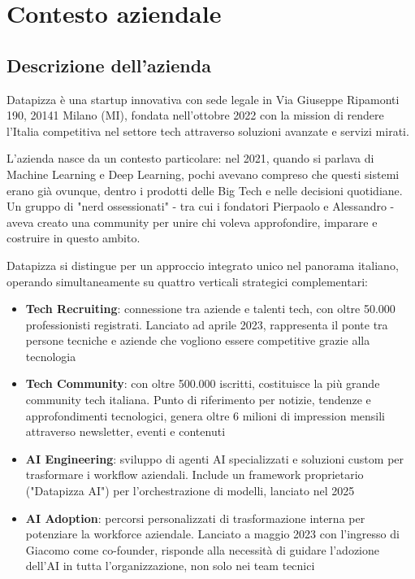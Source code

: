 \chapter{Contesto aziendale}

\section{Descrizione dell'azienda}
Datapizza è una startup innovativa con sede legale in Via Giuseppe Ripamonti 190, 20141 Milano (MI), fondata nell'ottobre 2022 con la mission di rendere l'Italia competitiva nel settore tech attraverso soluzioni avanzate e servizi mirati.

L'azienda nasce da un contesto particolare: nel 2021, quando si parlava di Machine Learning e Deep Learning, pochi avevano compreso che questi sistemi erano già ovunque, dentro i prodotti delle Big Tech e nelle decisioni quotidiane. Un gruppo di "nerd ossessionati" - tra cui i fondatori Pierpaolo e Alessandro - aveva creato una community per unire chi voleva approfondire, imparare e costruire in questo ambito.

Datapizza si distingue per un approccio integrato unico nel panorama italiano, operando simultaneamente su quattro verticali strategici complementari:

\begin{itemize}
  \item \textbf{Tech Recruiting}: connessione tra aziende e talenti tech, con oltre 50.000 professionisti registrati. Lanciato ad aprile 2023, rappresenta il ponte tra persone tecniche e aziende che vogliono essere competitive grazie alla tecnologia
  
  \item \textbf{Tech Community}: con oltre 500.000 iscritti, costituisce la più grande community tech italiana. Punto di riferimento per notizie, tendenze e approfondimenti tecnologici, genera oltre 6 milioni di impression mensili attraverso newsletter, eventi e contenuti
  
  \item \textbf{AI Engineering}: sviluppo di agenti AI specializzati e soluzioni custom per trasformare i workflow aziendali. Include un framework proprietario ("Datapizza AI") per l'orchestrazione di modelli, lanciato nel 2025
  
  \item \textbf{AI Adoption}: percorsi personalizzati di trasformazione interna per potenziare la workforce aziendale. Lanciato a maggio 2023 con l'ingresso di Giacomo come co-founder, risponde alla necessità di guidare l'adozione dell'AI in tutta l'organizzazione, non solo nei team tecnici
\end{itemize}

